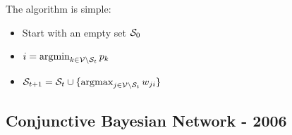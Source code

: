 \documentclass[]{article}
\begin{document}
	The algorithm is simple:
	\begin{itemize}
		\item Start with an empty set ${\cal S}_0$
		\item $i =  \operatorname*{\arg\!\min}_{k \in {\cal V} \setminus {\cal S}_t} p_k $
		\item ${\cal S}_{t+1} = {\cal S}_t \cup \{\operatorname*{\arg\!\max}_{j \in {\cal V} \setminus {\cal S}_t} w_{ji}\} $
	\end{itemize}
	
	
	
	\subsection{Conjunctive Bayesian Network - 2006}
	
	
	
	
	
	
	
	
	
	
	
	
	
	
	
	
	
	
	
	
	
	
	
	
	
	
	
	
	
	
	
	
	
	
	
	
	
	
	
	
	
	
\end{document}
